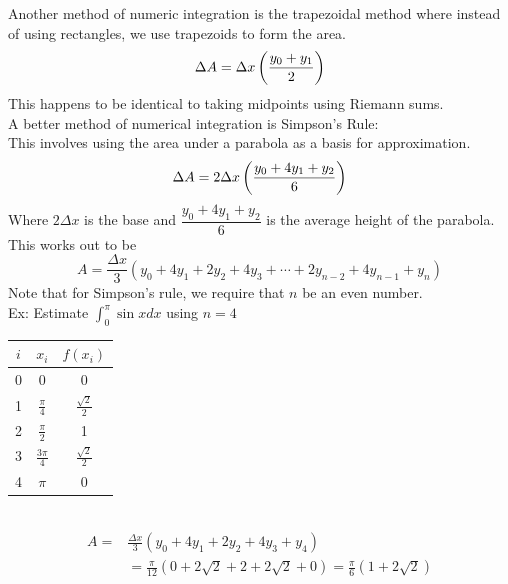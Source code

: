 \documentclass[11pt, fleqn]{article}
\begin{document}
Another method of numeric integration is the trapezoidal method where instead of using rectangles, we use trapezoids to form the area.
$$\Delta A=\Delta x\left( \frac{y_0+y_1}{2} \right)$$
This happens to be identical to taking midpoints using Riemann sums.\\
A better method of numerical integration is Simpson's Rule:\\
This involves using the area under a parabola as a basis for approximation.
$$\Delta A=2\Delta x\left( \frac{y_0+4y_1+y_2}{6} \right)$$
Where $2\Delta x$ is the base and $\dfrac{y_0+4y_1+y_2}{6}$ is the average height of the parabola. This works out to be
$$A=\frac{\Delta x}{3}(y_0+4y_1+2y_2+4y_3+\cdots+2y_{n-2}+4y_{n-1}+y_n)$$
Note that for Simpson's rule, we require that $n$ be an even number.\\
Ex: Estimate $\int_0^\pi\sin xdx$ using $n=4$\\
\begin{tabular}{c|c|c}
    $i$ & $x_i$ & $f(x_i)$\\
    \hline
    0 & 0 & 0\\
    1 & $\frac{\pi}{4}$ & $\frac{\sqrt{2}}{2}$\\
    2 & $\frac{\pi}{2}$ & 1\\
    3 & $\frac{3\pi}{4}$ & $\frac{\sqrt{2}}{2}$\\
    4 & $\pi$ & 0
\end{tabular}\\
\begin{align*}
    A=&\frac{\Delta x}{3}(y_0+4y_1+2y_2+4y_3+y_4)\\
    &=\frac{\pi}{12}(0+2\sqrt{2}+2+2\sqrt{2}+0)=\frac{\pi}{6}(1+2\sqrt{2})
\end{align*}
\end{document}
